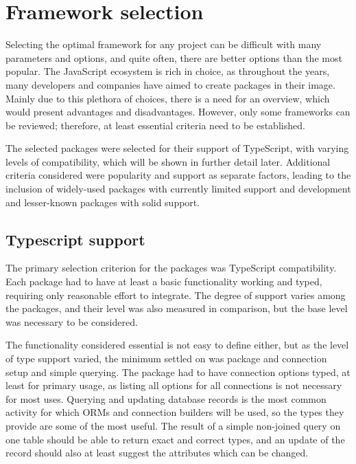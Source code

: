\chapter{Framework selection}

Selecting the optimal framework for any project can be difficult with many parameters and options, and quite often, there are better options than the most popular. The JavaScript ecosystem is rich in choice, as throughout the years, many developers and companies have aimed to create packages in their image. Mainly due to this plethora of choices, there is a need for an overview, which would present advantages and disadvantages. However, only some frameworks can be reviewed; therefore, at least essential criteria need to be established. \par
The selected packages were selected for their support of TypeScript, with varying levels of compatibility, which will be shown in further detail later. Additional criteria considered were popularity and support as separate factors, leading to the inclusion of widely-used packages with currently limited support and development and lesser-known packages with solid support. \par
\section{Typescript support}
The primary selection criterion for the packages was TypeScript compatibility. Each package had to have at least a basic functionality working and typed, requiring only reasonable effort to integrate. The degree of support varies among the packages, and their level was also measured in comparison, but the base level was necessary to be considered.\par
The functionality considered essential is not easy to define either, but as the level of type support varied, the minimum settled on was package and connection setup and simple querying. The package had to have connection options typed, at least for primary usage, as listing all options for all connections is not necessary for most uses. Querying and updating database records is the most common activity for which ORMs and connection builders will be used, so the types they provide are some of the most useful. The result of a simple non-joined query on one table should be able to return exact and correct types, and an update of the record should also at least suggest the attributes which can be changed.\par

